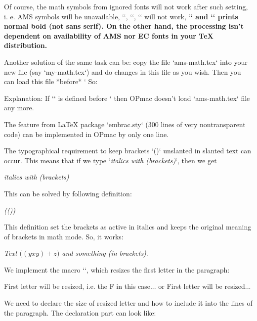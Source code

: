 Of course, the math symbols from ignored fonts will not work after such setting, i. e. AMS symbols will be unavailable, `\script`, `\frak`, `\bbchar` will not work, `\bf` and `\bi` prints normal bold (not sans serif). On the other hand, the processing isn't dependent on availability of AMS nor EC fonts in your TeX distribution. 



Another solution of the same task can be: copy the file `ams-math.tex` into your new file (say `my-math.tex`) and do changes in this file as you wish. Then you can load this file *before* ` So: 

\begtt
 
 
\endtt


Explanation: If `\normalmath` is defined before ` then OPmac doesn't load `ams-math.tex` file any more. 


 


The feature from LaTeX package `embrac.sty` (300 lines of very nontransparent code) can be implemented in OPmac by only one line. 



The typographical requirement to keep brackets `()` unslanted in slanted text can occur. This means that if we type `{\em italics with (brackets)}`, then we get 

\begtt
{\it italics with {\rm(}brackets{\/\rm)}} 
\endtt


This can be solved by following definition: 

\begtt
\addto\em{\adef({\ifmmode(\else{\rm(}\fi}\adef){\ifmmode)\else{\/\rm)}\fi}} 
\endtt


This definition set the brackets as active in italics and keeps the original meaning of brackets in math mode. So, it works: 

\begtt
{\em Text $\bigl((yxy)+z\bigr)$ and something (in brackets)}. 
\endtt

 


We implement the macro `\Capinsert`, which resizes the first letter in the paragraph: 

\begtt
\Capinsert First letter will be resized, i.e. the F in this case... 
or 
 First letter will be resized... 
\endtt


We need to declare the size of resized letter and how to include it into the lines of the paragraph. The declaration part can look like: 

